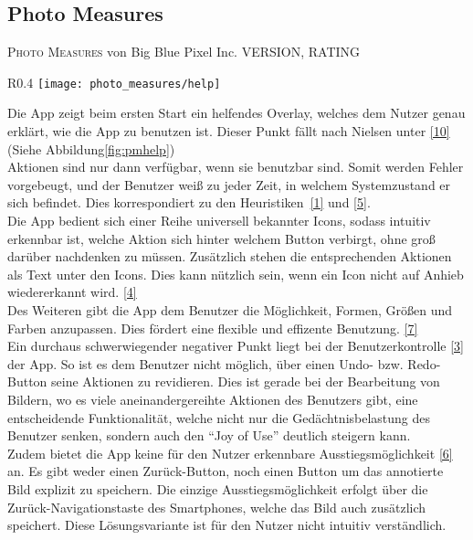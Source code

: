 \subsection{Photo Measures}

\textsc{Photo Measures} von Big Blue Pixel Inc. VERSION, RATING  \\

\begin{wrapfigure}{R}{0.4\textwidth}
	\centering
	\texttt{[image: photo\_measures/help]}
	\caption{Initialer Start}	
	\label{fig:pmhelp}
\end{wrapfigure}

Die App zeigt beim ersten Start ein helfendes Overlay, welches dem Nutzer genau erklärt, wie die App zu benutzen ist. Dieser Punkt fällt nach Nielsen unter \ref{10} (Siehe Abbildung\ref{fig:pmhelp}) \\
 
Aktionen sind nur dann verfügbar, wenn sie benutzbar sind. Somit werden Fehler vorgebeugt, und der Benutzer weiß zu jeder Zeit, in welchem Systemzustand er sich befindet. Dies korrespondiert zu den Heuristiken~\ref{1} und \ref{5}.  \\

Die App bedient sich einer Reihe universell bekannter Icons, sodass intuitiv erkennbar ist, welche Aktion sich hinter welchem Button verbirgt, ohne groß darüber nachdenken zu müssen. Zusätzlich stehen die entsprechenden Aktionen als Text unter den Icons. Dies kann nützlich sein, wenn ein Icon nicht auf Anhieb wiedererkannt wird. \ref{4}  \\

Des Weiteren gibt die App dem Benutzer die Möglichkeit, Formen, Größen und Farben anzupassen. Dies fördert eine flexible und effizente Benutzung. \ref{7} \\

Ein durchaus schwerwiegender negativer Punkt liegt bei der Benutzerkontrolle \ref{3} der App. So ist es dem Benutzer nicht möglich, über einen Undo- bzw. Redo-Button seine Aktionen zu revidieren. Dies ist gerade bei der Bearbeitung von Bildern, wo es viele aneinandergereihte Aktionen des Benutzers gibt, eine entscheidende Funktionalität, welche nicht nur die Gedächtnisbelastung des Benutzer senken, sondern auch den ``Joy of Use'' deutlich steigern kann. \\

Zudem bietet die App keine für den Nutzer erkennbare Ausstiegsmöglichkeit \ref{6} an. Es gibt weder einen Zurück-Button, noch einen Button um das annotierte Bild explizit zu speichern. Die einzige Ausstiegsmöglichkeit erfolgt über die Zurück-Navigationstaste des Smartphones, welche das Bild auch zusätzlich speichert. Diese Lösungsvariante ist für den Nutzer nicht intuitiv verständlich. 

